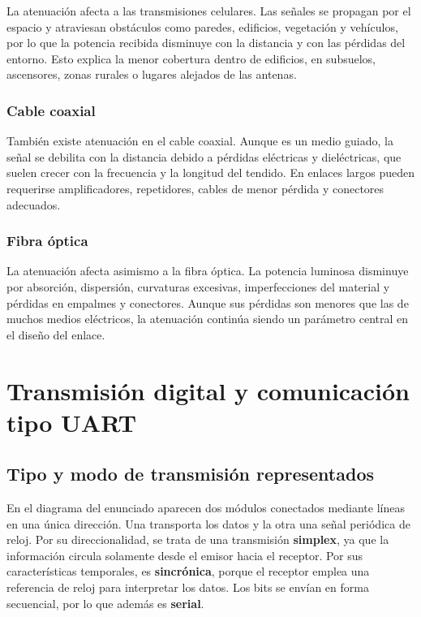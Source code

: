\documentclass[12pt,a4paper]{article}
\begin{document}
La atenuación afecta a las transmisiones celulares. Las señales se propagan por
el espacio y atraviesan obstáculos como paredes, edificios, vegetación y
vehículos, por lo que la potencia recibida disminuye con la distancia y con las
pérdidas del entorno. Esto explica la menor cobertura dentro de edificios, en
subsuelos, ascensores, zonas rurales o lugares alejados de las antenas.

\subsubsection{Cable coaxial}

También existe atenuación en el cable coaxial. Aunque es un medio guiado, la
señal se debilita con la distancia debido a pérdidas eléctricas y dieléctricas,
que suelen crecer con la frecuencia y la longitud del tendido. En enlaces largos
pueden requerirse amplificadores, repetidores, cables de menor pérdida y
conectores adecuados.

\subsubsection{Fibra óptica}

La atenuación afecta asimismo a la fibra óptica. La potencia luminosa disminuye
por absorción, dispersión, curvaturas excesivas, imperfecciones del material y
pérdidas en empalmes y conectores. Aunque sus pérdidas son menores que las de
muchos medios eléctricos, la atenuación continúa siendo un parámetro central en
el diseño del enlace.

\section{Transmisión digital y comunicación tipo UART}

\subsection{Tipo y modo de transmisión representados}

En el diagrama del enunciado aparecen dos módulos conectados mediante líneas en
una única dirección. Una transporta los datos y la otra una señal periódica de
reloj. Por su direccionalidad, se trata de una transmisión \textbf{simplex}, ya
que la información circula solamente desde el emisor hacia el receptor. Por sus
características temporales, es \textbf{sincrónica}, porque el receptor emplea
una referencia de reloj para interpretar los datos. Los bits se envían en forma
secuencial, por lo que además es \textbf{serial}.
\end{document}
